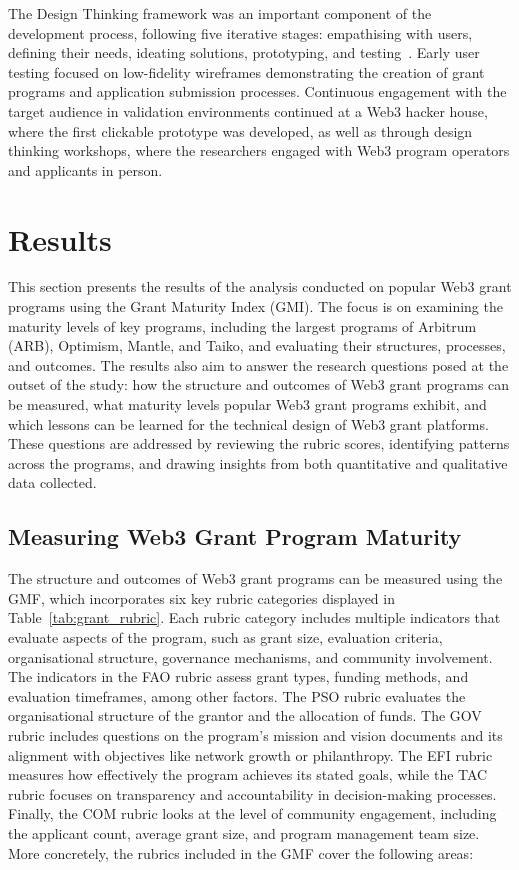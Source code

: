 \documentclass[conference]{IEEEtran}
\begin{document}
The Design Thinking framework was an important component of the development process, following five iterative stages: empathising with users, defining their needs, ideating solutions, prototyping, and testing~\cite{ambrose_basics_2010,wolniak_design_2017}. Early user testing focused on low-fidelity wireframes demonstrating the creation of grant programs and application submission processes. Continuous engagement with the target audience in validation environments continued at a Web3 hacker house, where the first clickable prototype was developed, as well as through design thinking workshops, where the researchers engaged with Web3 program operators and applicants in person.

\section{Results}\label{sec_4}

This section presents the results of the analysis conducted on popular Web3 grant programs using the Grant Maturity Index (GMI). The focus is on examining the maturity levels of key programs, including the largest programs of Arbitrum (ARB), Optimism, Mantle, and Taiko, and evaluating their structures, processes, and outcomes. The results also aim to answer the research questions posed at the outset of the study: how the structure and outcomes of Web3 grant programs can be measured, what maturity levels popular Web3 grant programs exhibit, and which lessons can be learned for the technical design of Web3 grant platforms. These questions are addressed by reviewing the rubric scores, identifying patterns across the programs, and drawing insights from both quantitative and qualitative data collected.

\subsection{Measuring Web3 Grant Program Maturity}\label{sec_4.1}

The structure and outcomes of Web3 grant programs can be measured using the GMF, which incorporates six key rubric categories displayed in Table~\ref{tab:grant_rubric}. Each rubric category includes multiple indicators that evaluate aspects of the program, such as grant size, evaluation criteria, organisational structure, governance mechanisms, and community involvement. The indicators in the FAO rubric assess grant types, funding methods, and evaluation timeframes, among other factors. The PSO rubric evaluates the organisational structure of the grantor and the allocation of funds. The GOV rubric includes questions on the program's mission and vision documents and its alignment with objectives like network growth or philanthropy. The EFI rubric measures how effectively the program achieves its stated goals, while the TAC rubric focuses on transparency and accountability in decision-making processes. Finally, the COM rubric looks at the level of community engagement, including the applicant count, average grant size, and program management team size. More concretely, the rubrics included in the GMF cover the following areas:\\
\end{document}
